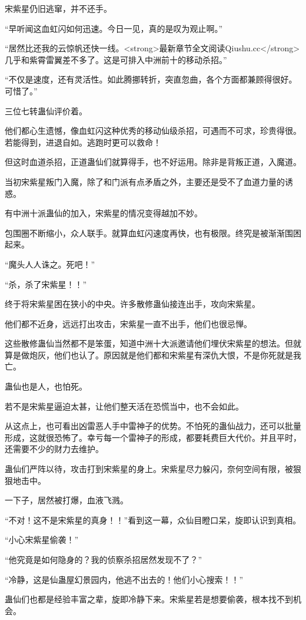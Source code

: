 \begin{this_body}
宋紫星仍旧逃窜，并不还手。

“早听闻这血虹闪如何迅速。今日一见，真的是叹为观止啊。”

“居然比还我的云惊帆还快一线。<strong>最新章节全文阅读Qiushu.cc</strong>几乎和紫霄雷翼差不多了。这是可排入中洲前十的移动杀招。”

“不仅是速度，还有灵活性。如此腾挪转折，突直忽曲，各个方面都兼顾得很好。可惜了。”

三位七转蛊仙评价着。

他们都心生遗憾，像血虹闪这种优秀的移动仙级杀招，可遇而不可求，珍贵得很。若能得到，进退自如。逃跑时更可以救命！

但这时血道杀招，正道蛊仙们就算得手，也不好运用。除非是背叛正道，入魔道。

当初宋紫星叛门入魔，除了和门派有点矛盾之外，主要还是受不了血道力量的诱惑。

有中洲十派蛊仙的加入，宋紫星的情况变得越加不妙。

包围圈不断缩小，众人联手。就算血虹闪速度再快，也有极限。终究是被渐渐围困起来。

“魔头人人诛之。死吧！”

“杀，杀了宋紫星！！”

终于将宋紫星困在狭小的中央。许多散修蛊仙接连出手，攻向宋紫星。

他们都不近身，远远打出攻击，宋紫星一直不出手，他们也很忌惮。

这些散修蛊仙当然都不是笨蛋，知道中洲十大派邀请他们埋伏宋紫星的想法。但就算是做炮灰，他们也认了。原因就是他们都和宋紫星有深仇大恨，不是你死就是我亡。

蛊仙也是人，也怕死。

若不是宋紫星逼迫太甚，让他们整天活在恐慌当中，也不会如此。

从这点上，也可看出凶雷恶人手中雷神子的优势。不怕死的蛊仙战力，还可以批量形成，这就很恐怖了。幸亏每一个雷神子的形成，都要耗费巨大代价。并且平时，还需要不少的财力去维护。

蛊仙们严阵以待，攻击打到宋紫星的身上。宋紫星尽力躲闪，奈何空间有限，被狠狠地击中。

一下子，居然被打爆，血液飞溅。

“不对！这不是宋紫星的真身！！”看到这一幕，众仙目瞪口呆，旋即认识到真相。

“小心宋紫星偷袭！”

“他究竟是如何隐身的？我的侦察杀招居然发现不了？”

“冷静，这是仙蛊屋幻景园内，他逃不出去的！他们小心搜索！！”

蛊仙们也都是经验丰富之辈，旋即冷静下来。宋紫星若是想要偷袭，根本找不到机会。


\end{this_body}
